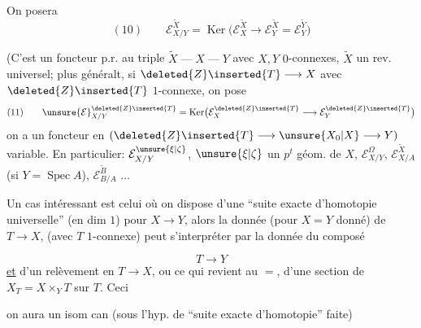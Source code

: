 On posera
\[
(10)\qquad \mathcal E_{X/Y}^{\widetilde X}=\operatorname{Ker}\bigl(\mathcal E_X^{\widetilde X}\longrightarrow\mathcal E_Y^{\widetilde X}=\mathcal E_Y^{\widetilde Y}\bigr)
\]



(C'est un foncteur p.r. au triple $\widetilde X\mathrel{\text{---}}X\mathrel{\text{---}}Y$ avec $X,Y$ $0$-connexes, $\widetilde X$ un rev. universel; plus généralt, si $\deleted{Z}\inserted{T}\longrightarrow X$ avec $\deleted{Z}\inserted{T}$ $1$-connexe, on pose
\[
(11)\qquad \unsure{\mathcal E}_{X/Y}^{\deleted{Z}\inserted{T}}=\operatorname{Ker}\bigl(\mathcal E_X^{\deleted{Z}\inserted{T}}\longrightarrow\mathcal E_Y^{\deleted{Z}\inserted{T}}\bigr)
\]
on a un foncteur en  $(\deleted{Z}\inserted{T}\longrightarrow\unsure{X_0|X}\longrightarrow Y)$ variable. En particulier: $\mathcal E_{X/Y}^{\unsure{\xi|\zeta}}$, $\unsure{\xi|\zeta}$ un $p^t$ géom. de $X$, $\mathcal E_{X/Y}^{\Omega}$, $\mathcal E_{X/A}^{\widetilde X}$ (si $Y=\operatorname{Spec} A$), $\mathcal E_{B/A}^{\widetilde B}$ $\ldots$


Un cas intéressant est celui où on dispose d'une ``suite exacte d'homotopie universelle''  (en dim $1$) pour $X\longrightarrow Y$, alors la donnée (pour $X=Y$ donné) de $T\longrightarrow X$, (avec $T$ $1$-connexe) peut s'interpréter par la donnée du composé



\[
T\longrightarrow Y
\]
\uline{et} d'un relèvement en $T\longrightarrow X$, ou ce qui revient au $=$, d'une section de $X_T=X\times_YT$ sur $T$. Ceci 

\noindent
\begin{minipage}[t]{.45\linewidth}
\vspace{\baselineskip}
\end{minipage}\hfill
\begin{minipage}[t]{.51\linewidth}
\vspace{0pt}
on aura un isom can (sous l'hyp. de ``suite exacte d'homotopie'' faite)
\end{minipage}

